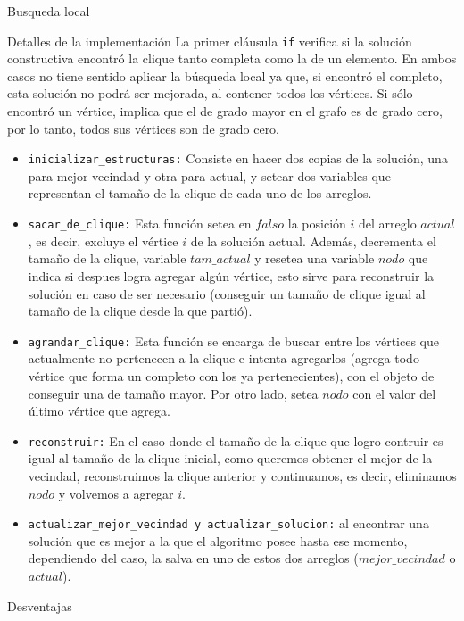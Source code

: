 \begin{section}{Busqueda local}
\begin{subsection}{Detalles de la implementación}
		La primer cláusula \texttt{if} verifica si la solución constructiva encontró la clique tanto completa como la de un elemento. En ambos casos no tiene sentido aplicar la búsqueda local ya que, si encontró el completo, esta solución no podrá ser mejorada, al contener todos los vértices. Si sólo encontró un vértice, implica que el de grado mayor en el grafo es de grado cero, por lo tanto, todos sus vértices son de grado cero. 

		\begin{itemize}
			\item \texttt{inicializar\_estructuras:} Consiste en hacer dos copias de la solución, una para mejor vecindad y otra para actual, y setear dos variables que representan el tamaño de la clique de cada uno de los arreglos.
		
			\item \texttt{sacar\_de\_clique:} Esta función setea en $falso$ la posición $i$ del arreglo $actual$, es decir, excluye el vértice $i$ de la solución actual. Además, decrementa el tamaño de la clique, variable $tam\_actual$ y resetea una variable $nodo$ que indica si despues logra agregar algún vértice, esto sirve para reconstruir la solución en caso de ser necesario (conseguir un tamaño de clique igual al tamaño de la clique desde la que partió).
			
			\item \texttt{agrandar\_clique:} Esta función se encarga de buscar entre los vértices que actualmente no pertenecen a la clique e intenta agregarlos (agrega todo vértice que forma un completo con los ya pertenecientes), con el objeto de conseguir una de tamaño mayor. Por otro lado, setea $nodo$ con el valor del último vértice que agrega.

			\item \texttt{reconstruir:} En el caso donde el tamaño de la clique que logro contruir es igual al tamaño de la clique inicial, como queremos obtener el mejor de la vecindad, reconstruimos la clique anterior y continuamos, es decir, eliminamos $nodo$ y volvemos a agregar $i$.
			
			\item \texttt{actualizar\_mejor\_vecindad y actualizar\_solucion:} al encontrar una solución que es mejor a la que el algoritmo posee hasta ese momento, dependiendo del caso, la salva en uno de estos dos arreglos ($mejor\_vecindad$ o $actual$).
			
		\end{itemize}
		\end{subsection}
		\begin{subsection}{Desventajas}
		

\end{subsection}
\end{section}

